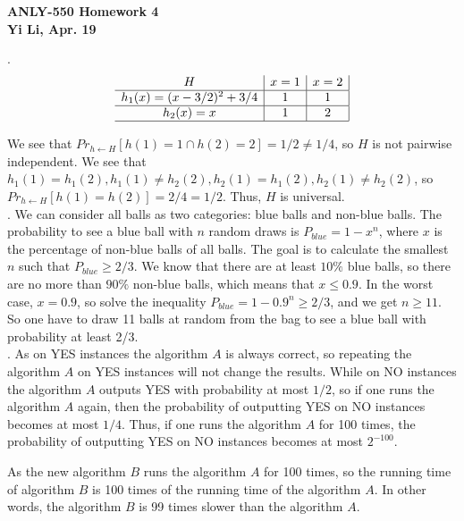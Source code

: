 \documentclass[11pt]{article} %
\begin{document}
\begin{center}
\large
\bf
ANLY-550 Homework 4 \\[1pc]
\rm
\normalsize
Yi Li, Apr. 19 \\[1.5pc]  
\end{center}


\normalsize
{}. 
$$
\begin{array}{c|c|c|c|c|c|c|}
H & x=1 & x=2  \\ \hline
h_1(x) = (x-3/2)^2 + 3/4 & 1 & 1 \\ \hline
h_2(x) = x  & 1 & 2 \\ \hline
\end{array}
$$ 

We see that $Pr_{h \leftarrow H}[h(1)=1 \cap h(2)=2] = 1/2 \neq 1/4$, so $H$ is not pairwise independent.
We see that $h_1(1) = h_1(2), h_1(1) \neq h_2(2), h_2(1) = h_1(2), h_2(1) \neq h_2(2)$, so $Pr_{h \leftarrow H}[h(1)=h(2)] = 2/4 = 1/2$. Thus, $H$ is universal.
\\

. We can consider all balls as two categories: blue balls and non-blue balls. The probability to see a blue ball with $n$ random draws is $P_{blue} = 1 - x^n$, where $x$ is the percentage of non-blue balls of all balls. 
The goal is to calculate the smallest $n$ such that $P_{blue} \geq 2/3$.
We know that there are at least $10\%$ blue balls, so there are no more than $90\%$ non-blue balls, which means that $x \leq 0.9$. 
In the worst case, $x=0.9$, so solve the inequality $P_{blue} = 1 - 0.9^n \geq 2/3$,
and we get $n \geq 11$. 
So one have to draw 11 balls at random from the bag to see a blue ball with probability at least 2/3. \\

. As on YES instances the algorithm $A$ is always correct, so repeating the algorithm $A$ on YES instances will not change the results. While on NO instances the algorithm $A$ outputs YES with probability at most $1/2$, so if one runs the algorithm $A$ again, then the probability of outputting YES on NO instances becomes at most $1/4$. Thus, if one runs the algorithm $A$ for 100 times, the probability of outputting YES on NO instances becomes at most $2^{-100}$.

As the new algorithm $B$ runs the algorithm $A$ for 100 times, so the running time of algorithm $B$ is 100 times of the running time of the algorithm $A$. In other words, the algorithm $B$ is 99 times slower than the algorithm $A$.\\
\end{document}
